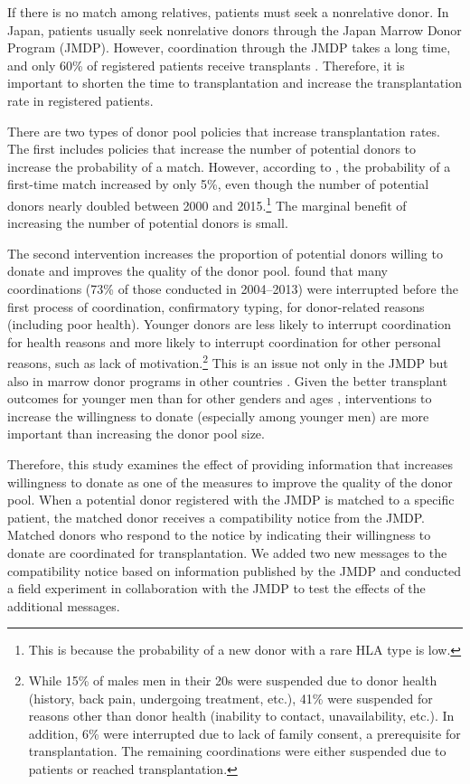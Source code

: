 \documentclass[12pt, a4paper]{article}
\begin{document}
If there is no match among relatives, patients must seek a nonrelative donor. In Japan, patients usually seek nonrelative donors through the Japan Marrow Donor Program (JMDP). However, coordination through the JMDP takes a long time, and only 60\% of registered patients receive transplants \citep{Hirakawa2018}. Therefore, it is important to shorten the time to transplantation and increase the transplantation rate in registered patients.

There are two types of donor pool policies that increase transplantation rates. The first includes policies that increase the number of potential donors to increase the probability of a match. However, according to \citet{Takanashi2016}, the probability of a first-time match increased by only 5\%, even though the number of potential donors nearly doubled between 2000 and 2015.\footnote{This is because the probability of a new donor with a rare HLA type is low.} The marginal benefit of increasing the number of potential donors is small.

The second intervention increases the proportion of potential donors willing to donate and improves the quality of the donor pool. \citet{Hirakawa2018} found that many coordinations (73\% of those conducted in 2004--2013) were interrupted before the first process of coordination, confirmatory typing, for donor-related reasons (including poor health). Younger donors are less likely to interrupt coordination for health reasons and more likely to interrupt coordination for other personal reasons, such as lack of motivation.\footnote{While 15\% of males men in their 20s were suspended due to donor health (history, back pain, undergoing treatment, etc.), 41\% were suspended for reasons other than donor health (inability to contact, unavailability, etc.). In addition, 6\% were interrupted due to lack of family consent, a prerequisite for transplantation. The remaining coordinations were either suspended due to patients or reached transplantation.} This is an issue not only in the JMDP but also in marrow donor programs in other countries \citep{Haylock2022}. Given the better transplant outcomes for younger men than for other genders and ages \citep[for example,][]{Kollman2016}, interventions to increase the willingness to donate (especially among younger men) are more important than increasing the donor pool size.

Therefore, this study examines the effect of providing information that increases willingness to donate as one of the measures to improve the quality of the donor pool. When a potential donor registered with the JMDP is matched to a specific patient, the matched donor receives a compatibility notice from the JMDP. Matched donors who respond to the notice by indicating their willingness to donate are coordinated for transplantation. We added two new messages to the compatibility notice based on information published by the JMDP and conducted a field experiment in collaboration with the JMDP to test the effects of the additional messages.
\end{document}
